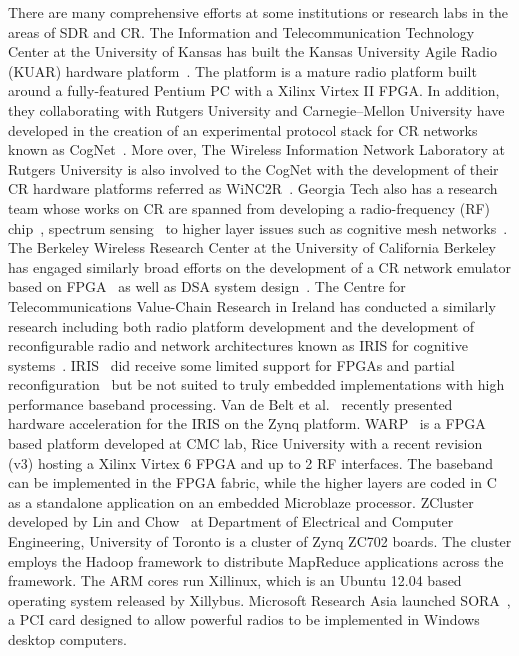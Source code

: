There are many comprehensive efforts at some institutions or research labs in the areas of SDR and CR. 
The Information and Telecommunication Technology Center at the University of Kansas has built the Kansas University Agile Radio (KUAR) hardware platform~\cite{Minden2007}. 
The platform is a mature radio platform built around a fully-featured Pentium PC with a Xilinx Virtex II FPGA.
In addition, they collaborating with Rutgers University and Carnegie–Mellon University have developed in the creation of an experimental protocol stack for CR networks known as CogNet~\cite{Raychaudhuri2006}. 
More over, The Wireless Information Network Laboratory at Rutgers University is also involved to the CogNet with the development of their CR hardware platforms referred as WiNC2R~\cite{Miljanic2007}.
Georgia Tech also has a research team whose works on CR are spanned from developing a radio-frequency (RF) chip~\cite{Mukhopadhyay2005}, spectrum sensing~\cite{Ganesan2005} to higher layer issues such as cognitive mesh networks~\cite{Chowdhury2008}. 
The Berkeley Wireless Research Center at the University of California Berkeley has engaged similarly broad efforts on the development of a CR network emulator based on FPGA~\cite{So2008} as well as DSA system design~\cite{Mishra2006}.
The Centre for Telecommunications Value-Chain Research in Ireland has conducted a similarly research including both radio platform development and the development of reconfigurable radio and network architectures known as IRIS for cognitive systems~\cite{Sutton2006}. IRIS~\cite{Sutton2010} did receive some limited support for FPGAs and partial reconfiguration~\cite{fahmy2009,lotze2009} but be not suited to truly embedded implementations with high performance baseband processing. Van de Belt et al.~\cite{Belt2013} recently presented hardware acceleration for the IRIS on the Zynq platform.
WARP~\cite{amiri2007} is a FPGA based platform developed at CMC lab, Rice University with a recent revision (v3) hosting a Xilinx Virtex 6 FPGA and up to 2 RF interfaces. The baseband can be implemented in the FPGA fabric, while the higher layers are coded in C as a standalone application on an embedded Microblaze processor.
ZCluster developed by Lin and Chow~\cite{Lin2013} at Department of Electrical and Computer Engineering, University of Toronto is a cluster of Zynq ZC702 boards. The cluster employs the Hadoop framework to distribute MapReduce applications across the framework. The ARM cores run Xillinux, which is an Ubuntu 12.04 based operating system released by Xillybus.
Microsoft Research Asia launched SORA~\cite{tan2011sora}, a PCI card designed to allow powerful radios to be implemented in Windows desktop computers.
